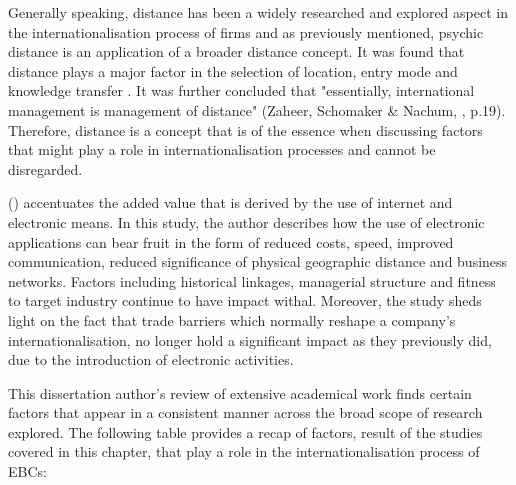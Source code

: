 \documentclass[11pt,a4paper]{article}
\begin{document}
Generally speaking, distance has been a widely researched and explored aspect in the internationalisation process of firms and as previously mentioned, psychic distance is an application of a broader distance concept. It was found that distance plays a major factor in the selection of location, entry mode and knowledge transfer \parencite{xuInstitutionalDistanceMultinational2002, kostovaTransnationalTransferStrategic1999, tihanyiEffectCulturalDistance2005}. It was further concluded that "essentially, international management is management of distance" (Zaheer, Schomaker \& Nachum, \citeyear{zaheerDistanceDirectionRestoring2012}, p.19). Therefore, distance is a concept that is of the essence when discussing factors that might play a role in internationalisation processes and cannot be disregarded. \par
\citeauthor{terziImpactEcommerceInternational2011} (\citeyear{terziImpactEcommerceInternational2011}) accentuates the added value that is derived by the use of internet and electronic means. In this study, the author describes how the use of electronic applications can bear fruit in the form of reduced costs, speed, improved communication, reduced significance of physical geographic distance and business networks. Factors including historical linkages, managerial structure and fitness to target industry continue to have impact withal. Moreover, the study sheds light on the fact that trade barriers which normally reshape a company's internationalisation, no longer hold a significant impact as they previously did, due to the introduction of electronic activities. \par

This dissertation author's review of extensive academical work finds certain factors that appear in a consistent manner across the broad scope of research explored. The following table provides a recap of factors, result of the studies covered in this chapter, that play a role in the internationalisation process of EBCs:
\end{document}
